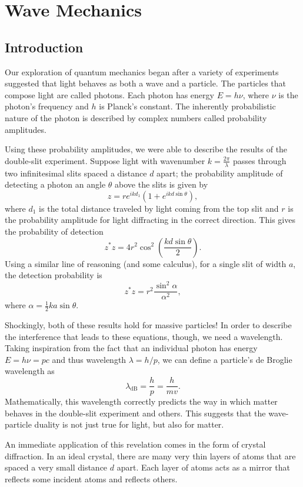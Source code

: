 \documentclass[../p052main.tex]{subfiles}
\begin{document}
\chapter{Wave Mechanics}
\section{Introduction}
Our exploration of quantum mechanics began after a variety of experiments suggested that light behaves as both a wave and a particle.
The particles that compose light are called photons.
Each photon has energy $E = h\nu$, where $\nu$ is the photon's frequency and $h$ is Planck's constant.
The inherently probabilistic nature of the photon is described by complex numbers called probability amplitudes.

Using these probability amplitudes, we were able to describe the results of the double-slit experiment.
Suppose light with wavenumber $k = \frac{2\pi}{\lambda}$ passes through two infinitesimal slits spaced a distance $d$ apart; the probability amplitude of detecting a photon an angle $\theta$ above the slits is given by
\[ z = re^{ikd_1} \left( 1 + e^{ikd \sin \theta} \right), \]
where $d_1$ is the total distance traveled by light coming from the top slit and $r$ is the probability amplitude for light diffracting in the correct direction.
This gives the probability of detection
\[ z^*z = 4r^2 \cos^2 \left( \frac{kd \sin \theta}{2} \right). \]
Using a similar line of reasoning (and some calculus), for a single slit of width $a$, the detection probability is
\[ z^*z = r^2 \frac{\sin^2 \alpha}{\alpha^2}, \]
where $\alpha = \frac{1}{2}ka\sin\theta$.

Shockingly, both of these results hold for massive particles!
In order to describe the interference that leads to these equations, though, we need a wavelength.
Taking inspiration from the fact that an individual photon has energy $E = h\nu = pc$ and thus wavelength $\lambda = h/p$, we can define a particle's de Broglie wavelength as
\[ \lambda_\text{dB} = \frac{h}{p} = \frac{h}{mv}. \]
Mathematically, this wavelength correctly predicts the way in which matter behaves in the double-slit experiment and others.
This suggests that the wave-particle duality is not just true for light, but also for matter.

An immediate application of this revelation comes in the form of crystal diffraction.
In an ideal crystal, there are many very thin layers of atoms that are spaced a very small distance $d$ apart.
Each layer of atoms acts as a mirror that reflects some incident atoms and reflects others.
\end{document}
